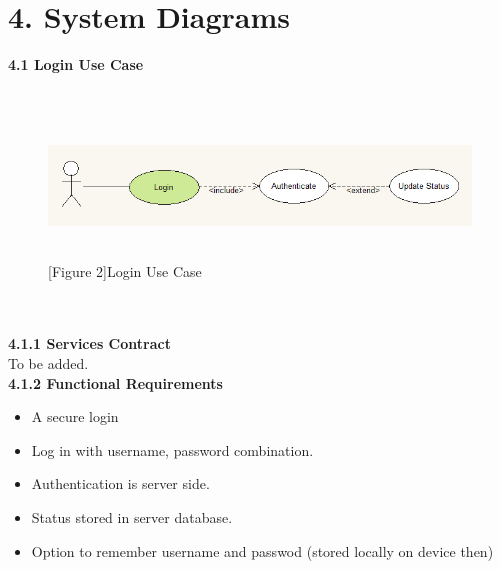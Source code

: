 \documentclass[29pt,a4paper]{moderncv}
\begin{document}
	\section*{\textbf{4. System Diagrams}}
	\vspace{2mm}
	 \left\textbf{4.1 Login Use Case}\\
		\\ \begin{figure}
			\centering
			\\ \includegraphics[width=6.0in, height=1.2in]{./loginCase.png}
			\\\caption{[Figure 2]Login Use Case}
		\end{figure}\\
	
		\\ \noindent\textbf{4.1.1 Services Contract}\\
		To be added.\\
		
		\noindent\textbf{4.1.2 Functional Requirements}
			\begin{itemize}
				\item A secure login
				\item Log in with username, password combination.
				\item Authentication is server side.
				\item Status stored in server database.
				\item Option to remember username and passwod (stored locally on device then)\\			
			\end{itemize}
			
\end{document}
